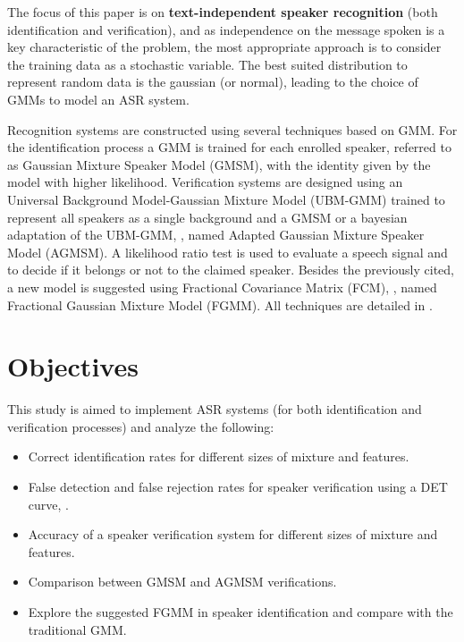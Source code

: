 The focus of this paper is on \textbf{text-independent speaker recognition} (both identification and verification), and as independence on the message spoken is a key characteristic of the problem, the most appropriate approach is to consider the training data as a stochastic variable. The best suited distribution to represent random data is the gaussian (or normal), leading to the choice of GMMs to model an ASR system.

Recognition systems are constructed using several techniques based on GMM. For the identification process a GMM is trained for each enrolled speaker, referred to as Gaussian Mixture Speaker Model (GMSM), with the identity given by the model with higher likelihood. Verification systems are designed using an Universal Background Model-Gaussian Mixture Model (UBM-GMM) trained to represent all speakers as a single background and a GMSM or a bayesian adaptation of the UBM-GMM, , named Adapted Gaussian Mixture Speaker Model (AGMSM). A likelihood ratio test is used to evaluate a speech signal and to decide if it belongs or not to the claimed speaker. Besides the previously cited, a new model is suggested using Fractional Covariance Matrix (FCM), , named Fractional Gaussian Mixture Model (FGMM). All techniques are detailed in .


\section{Objectives}

This study is aimed to implement ASR systems (for both identification and verification processes) and analyze the following:

\begin{itemize}\itemsep0pt
    \item Correct identification rates for different sizes of mixture and features.
    \item False detection and false rejection rates for speaker verification using a DET curve, .
    \item Accuracy of a speaker verification system for different sizes of mixture and features.
    \item Comparison between GMSM and AGMSM verifications.
    \item Explore the suggested FGMM in speaker identification and compare with the traditional GMM.
\end{itemize}

